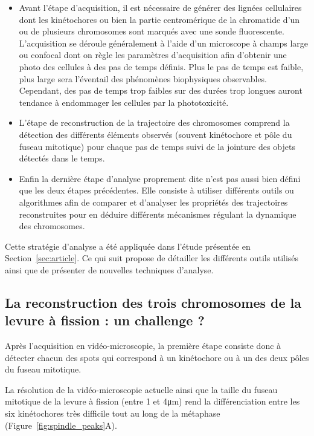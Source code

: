 \documentclass[12pt,a4paper,twoside,openright]{book}
\begin{document}
\begin{itemize}
\item
  Avant l'étape d'acquisition, il est nécessaire de générer des lignées
  cellulaires dont les kinétochores ou bien la partie centromérique de
  la chromatide d'un ou de plusieurs chromosomes sont marqués avec une
  sonde fluorescente. L'acquisition se déroule généralement à l'aide
  d'un microscope à champs large ou confocal dont on règle les
  paramètres d'acquisition afin d'obtenir une photo des cellules à des
  pas de temps définis. Plus le pas de temps est faible, plus large sera
  l'éventail des phénomènes biophysiques observables. Cependant, des pas
  de temps trop faibles sur des durées trop longues auront tendance à
  endommager les cellules par la phototoxicité.
\item
  L'étape de reconstruction de la trajectoire des chromosomes comprend
  la détection des différents éléments observés (souvent kinétochore et
  pôle du fuseau mitotique) pour chaque pas de temps suivi de la
  jointure des objets détectés dans le temps.
\item
  Enfin la dernière étape d'analyse proprement dite n'est pas aussi bien
  défini que les deux étapes précédentes. Elle consiste à utiliser
  différents outils ou algorithmes afin de comparer et d'analyser les
  propriétés des trajectoires reconstruites pour en déduire différents
  mécanismes régulant la dynamique des chromosomes.
\end{itemize}

Cette stratégie d'analyse a été appliquée dans l'étude présentée en
Section~\ref{sec:article}. Ce qui suit propose de détailler les
différents outils utilisés ainsi que de présenter de nouvelles
techniques d'analyse.

\subsection{La reconstruction des trois chromosomes de la levure à
fission : un challenge
?}\label{la-reconstruction-des-trois-chromosomes-de-la-levure-uxe0-fission-un-challenge}

Après l'acquisition en vidéo-microscopie, la première étape consiste
donc à détecter chacun des spots qui correspond à un kinétochore ou à un
des deux pôles du fuseau mitotique.

La résolution de la vidéo-microscopie actuelle ainsi que la taille du
fuseau mitotique de la levure à fission (entre 1 et 4μm) rend la
différenciation entre les six kinétochores très difficile tout au long
de la métaphase (Figure~\ref{fig:spindle_peaks}A).
\end{document}
